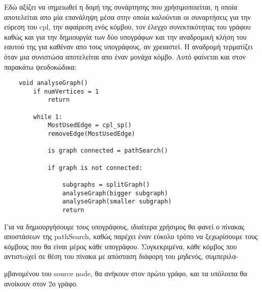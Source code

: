 \documentclass{article}
\begin{document}
Εδώ αξίζει να σημειωθεί η δομή της συνάρτησης που χρήσιμοποιείται, η οποία αποτελείται απο μία επανάληψη μέσα στην οποία καλούνται οι συναρτήσεις για την εύρεση του
cpl, την αφαίρεση ενός κόμβου, τον έλεγχο συνεκτικότητας του γράφου καθώς και για την δημιουργία των δύο υπογράφων και
την αναδρομική κλήση του εαυτού της για καθέναν απο τους υπογράφους, αν χρειαστεί. Η αναδρομή τερματίζει όταν μια συνιστώσα αποτελείται απο έναν μονάχα κόμβο.
Αυτό φαίνεται και στον παρακάτω ψευδοκώδικα:\bigbreak

\begin{lstlisting}
	void analyseGraph()
		if numVertices = 1	
			return
		
		while 1:
			MostUsedEdge = cpl_sp()
			removeEdge(MostUsedEdge)
			
			is graph connected = pathSearch()
	
			if graph is not connected:

				subgraphs = splitGraph()
				analyseGraph(bigger subgraph)								
				analyseGraph(smaller subgraph)				
				return
\end{lstlisting}\bigbreak{}

Για να δημιουργήσουμε τους υπογράφους, ιδιαίτερα χρήσιμος θα φανεί ο πίνακας αποστάσεων της pathSearch,
καθώς παρέχει έναν εύκολο τρόπο να ξεχωρίσουμε τους κόμβους που θα είναι μέρος κάθε υπογράφου. Συγκεκριμένα, κάθε κόμβος που αντιστoiχεί σε θέση του πίνακα
με απόσταση διάφορη του μηδενός, συμπεριλα-

μβανομένου του source node, θα ανήκουν στον πρώτο γράφο, και τα 
υπόλοιπα θα ανοίκουν στον 2ο γράφο.\bigbreak
\end{document}
